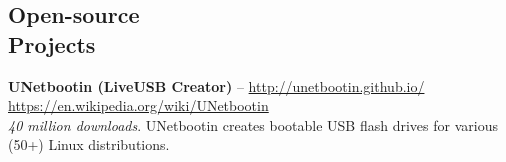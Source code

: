 \documentclass[margin,line]{resume}
\begin{document}
\begin{resume}


\section{\mysidestyle Open-source\\Projects}

\textbf{UNetbootin (LiveUSB Creator)} -- \url{http://unetbootin.github.io/} \hfill \url{https://en.wikipedia.org/wiki/UNetbootin}\\ %
\emph{40 million downloads}. UNetbootin creates bootable USB flash drives for various (50+) Linux distributions.\\ %


\end{resume}
\end{document}
